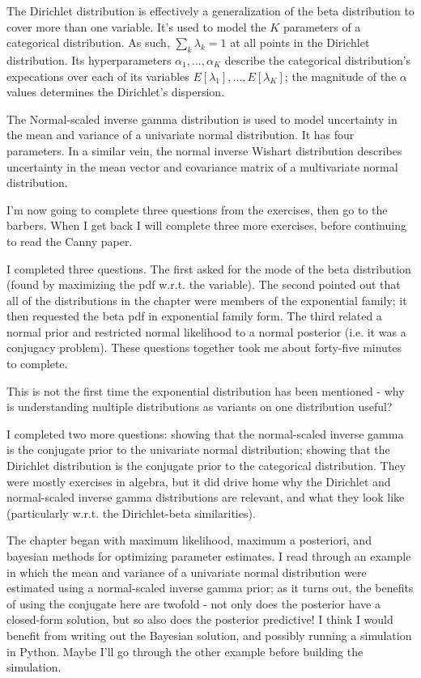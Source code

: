 \documentclass[idxtotoc,hyperref,openany]{labbook} %
\begin{document}
The Dirichlet distribution is effectively a generalization of the beta distribution to cover more than one variable. It's used to model the $K$ parameters of a categorical distribution. As such, $\sum_k \lambda_k = 1$ at all points in the Dirichlet distribution. Its hyperparameters $\alpha_1, ..., \alpha_K$ describe the categorical distribution's expecations over each of its variables $E[\lambda_1], ..., E[\lambda_K]$; the magnitude of the $\alpha$ values determines the Dirichlet's dispersion.

The Normal-scaled inverse gamma distribution is used to model uncertainty in the mean and variance of a univariate normal distribution. It has four parameters. In a similar vein, the normal inverse Wishart distribution describes uncertainty in the mean vector and covariance matrix of a multivariate normal distribution.

I'm now going to complete three questions from the exercises, then go to the barbers. When I get back I will complete three more exercises, before continuing to read the Canny paper.

I completed three questions. The first asked for the mode of the beta distribution (found by maximizing the pdf w.r.t. the variable). The second pointed out that all of the distributions in the chapter were members of the exponential family; it then requested the beta pdf in exponential family form. The third related a normal prior and restricted normal likelihood to a normal posterior (i.e. it was a conjugacy problem). These questions together took me about forty-five minutes to complete.

This is not the first time the exponential distribution has been mentioned - why is understanding multiple distributions as variants on one distribution useful?

I completed two more questions: showing that the normal-scaled inverse gamma is the conjugate prior to the univariate normal distribution; showing that the Dirichlet distribution is the conjugate prior to the categorical distribution. They were mostly exercises in algebra, but it did drive home why the Dirichlet and normal-scaled inverse gamma distributions are relevant, and what they look like (particularly w.r.t. the Dirichlet-beta similarities).

The chapter began with maximum likelihood, maximum a posteriori, and bayesian methods for optimizing parameter estimates. I read through an example in which the mean and variance of a univariate normal distribution were estimated using a normal-scaled inverse gamma prior; as it turns out, the benefits of using the conjugate here are twofold - not only does the posterior have a closed-form solution, but so also does the posterior predictive! I think I would benefit from writing out the Bayesian solution, and possibly running a simulation in Python. Maybe I'll go through the other example before building the simulation.
\end{document}
